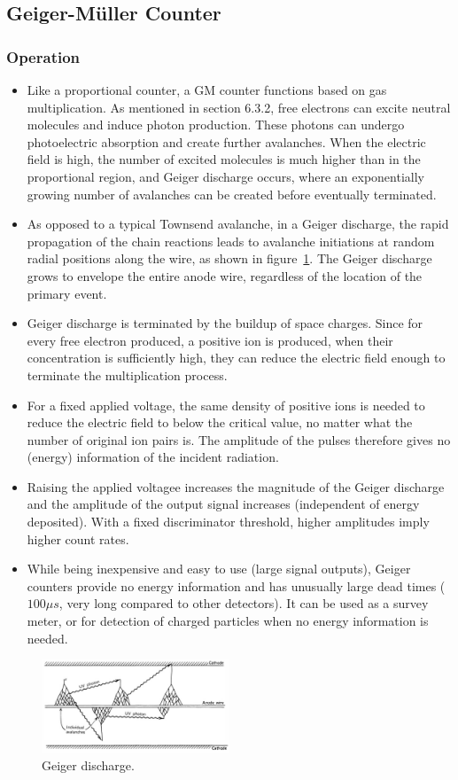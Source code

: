 \subsection{Geiger-Müller Counter}
\subsubsection{Operation}
\begin{itemize}
    \item Like a proportional counter, a GM counter functions based on gas multiplication. As mentioned in section 6.3.2, free electrons can excite neutral molecules and induce photon production. These photons can undergo photoelectric absorption and create further avalanches. When the electric field is high, the number of excited molecules is much higher than in the proportional region, and Geiger discharge occurs, where an exponentially growing number of avalanches can be created before eventually terminated.
    \item As opposed to a typical Townsend avalanche, in a Geiger discharge, the rapid propagation of the chain reactions leads to avalanche initiations at random radial positions along the wire, as shown in figure~\ref{fig:geiger_discharge}. The Geiger discharge grows to envelope the entire anode wire, regardless of the location of the primary event. 
    \item Geiger discharge is terminated by the buildup of space charges. Since for every free electron produced, a positive ion is produced,  when their concentration is sufficiently high, they can reduce the electric field enough to terminate the multiplication process. 
    \item For a fixed applied voltage, the same density of positive ions is needed to reduce the electric field to below the critical value, no matter what the number of original ion pairs is. The amplitude of the pulses therefore gives no (energy) information of the incident radiation. 
    \item Raising the applied voltagee increases the magnitude of the Geiger discharge and the amplitude of the output signal increases (independent of energy deposited). With a fixed discriminator threshold, higher amplitudes imply higher count rates. 
    \item While being inexpensive and easy to use (large signal outputs), Geiger counters provide no energy information and has unusually large dead times ($100\mu s$, very long compared to other detectors). It can be used as a survey meter, or for detection of charged particles when no energy information is needed.
\end{itemize}
\begin{figure}[ht]
    \centering
    \includegraphics[width=0.5\textwidth]{images/geiger_discharge.png}
    \caption{Geiger discharge.}
    \label{fig:geiger_discharge}
\end{figure}
